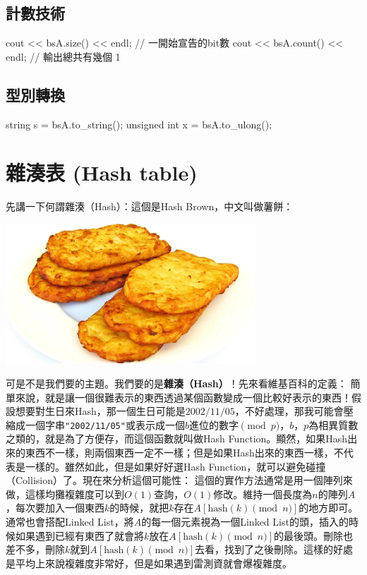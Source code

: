 \documentclass[main.tex]{subfiles}
\begin{document}
\subsection{計數技術}
\begin{C++}
cout << bsA.size() << endl; // 一開始宣告的bit數
cout << bsA.count() << endl; // 輸出總共有幾個 1
\end{C++}
\subsection{型別轉換}
\begin{C++}
string s = bsA.to_string();
unsigned int x = bsA.to_ulong();
\end{C++}
\section{雜湊表 (Hash table)}
先講一下何謂雜湊（Hash）：這個是Hash Brown，中文叫做薯餅：
\begin{center}
\includegraphics*[width = 0.7\textwidth]{images/hashbrown.jpg}
\end{center}
可是不是我們要的主題。我們要的是\textbf{雜湊（Hash）}！先來看維基百科的定義：
簡單來說，就是讓一個很難表示的東西透過某個函數變成一個比較好表示的東西！假設想要對生日來Hash，那一個生日可能是$2002/11/05$，不好處理，那我可能會壓縮成一個字串\texttt{"2002/11/05"}或表示成一個$b$進位的數字$\pmod p$，$b$，$p$為相異質數之類的，就是為了方便存，而這個函數就叫做Hash Function。顯然，如果Hash出來的東西不一樣，則兩個東西一定不一樣；但是如果Hash出來的東西一樣，不代表是一樣的。雖然如此，但是如果好好選Hash Function，就可以避免碰撞（Collision）了。現在來分析這個可能性：
這個的實作方法通常是用一個陣列來做，這樣均攤複雜度可以到$O(1)$查詢，$O(1)$修改。維持一個長度為$n$的陣列$A$，每次要加入一個東西$k$的時候，就把$k$存在$A[\text{hash}(k) \pmod n]$的地方即可。通常也會搭配Linked List，將$A$的每一個元素視為一個Linked List的頭，插入的時候如果遇到已經有東西了就會將$k$放在$A[\text{hash}(k) \pmod n]$的最後頭。刪除也差不多，刪除$k$就到$A[\text{hash}(k) \pmod n]$去看，找到了之後刪除。這樣的好處是平均上來說複雜度非常好，但是如果遇到雷測資就會爆複雜度。
\end{document}
